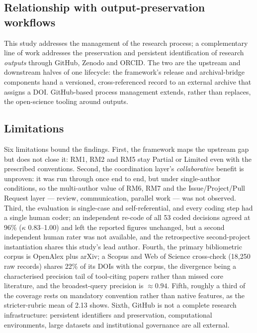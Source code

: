 \documentclass[pdflatex,sn-mathphys-num]{sn-jnl}%
\begin{document}
\subsection{Relationship with output-preservation workflows}\label{sec:d-relationship}

This study addresses the management of the research process; a complementary line of work addresses the preservation and persistent identification of research \emph{outputs} through GitHub, Zenodo and ORCID. The two are the upstream and downstream halves of one lifecycle: the framework's release and archival-bridge components hand a versioned, cross-referenced record to an external archive that assigns a DOI. GitHub-based process management extends, rather than replaces, the open-science tooling around outputs.

\subsection{Limitations}\label{sec:limitations}

Six limitations bound the findings. First, the framework maps the upstream gap but does not close it: RM1, RM2 and RM5 stay Partial or Limited even with the prescribed conventions. Second, the coordination layer's \emph{collaborative} benefit is unproven: it was run through once end to end, but under single-author conditions, so the multi-author value of RM6, RM7 and the Issue/Project/Pull Request layer --- review, communication, parallel work --- was not observed. Third, the evaluation is single-case and self-referential, and every coding step had a single human coder; an independent re-code of all 53 coded decisions agreed at 96\% ($\kappa$ 0.83--1.00) and left the reported figures unchanged, but a second independent human rater was not available, and the retrospective second-project instantiation shares this study's lead author. Fourth, the primary bibliometric corpus is OpenAlex plus arXiv; a Scopus and Web of Science cross-check (18{,}250 raw records) shares 22\% of its DOIs with the corpus, the divergence being a characterised precision tail of tool-citing papers rather than missed core literature, and the broadest-query precision is $\approx 0.94$. Fifth, roughly a third of the coverage rests on mandatory convention rather than native features, as the stricter-rubric mean of 2.13 shows. Sixth, GitHub is not a complete research infrastructure: persistent identifiers and preservation, computational environments, large datasets and institutional governance are all external.
\end{document}
